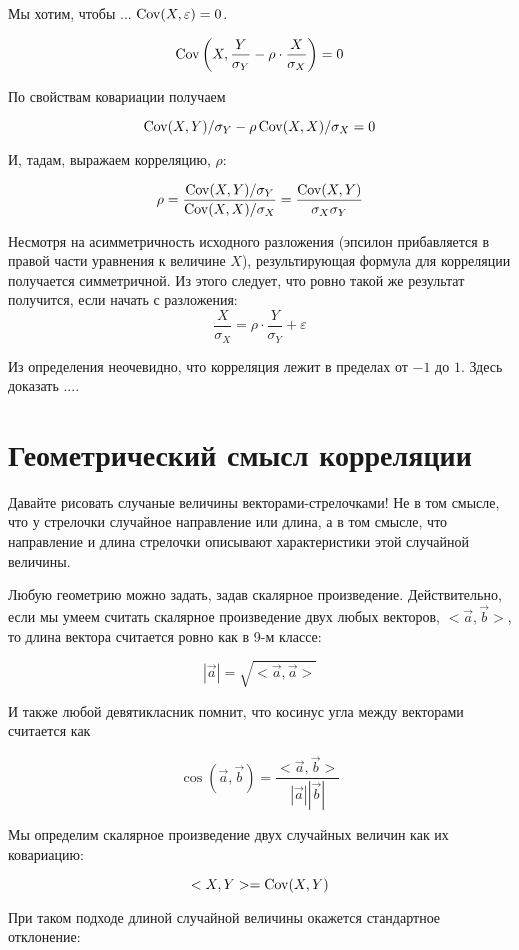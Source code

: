 \documentclass[10pt]{article}
\begin{document}
%

Мы хотим, чтобы ... $\operatorname{Cov}(X,\varepsilon)=0$. 


\[
\operatorname{Cov}\left(X, \frac{Y}{\sigma_Y} - \rho \cdot \frac{X}{\sigma_X} \right) = 0
\]

По свойствам ковариации получаем

\[
\operatorname{Cov}(X,Y)/\sigma_Y- \rho \operatorname{Cov}(X,X)/\sigma_X=0
\]

И, тадам, выражаем корреляцию, $\rho$:

\[
\rho = \frac{\operatorname{Cov}(X,Y)/\sigma_Y}{\operatorname{Cov}(X,X)/\sigma_X} = \frac{\operatorname{Cov}(X,Y)}{\sigma_X \sigma_Y}
\]

Несмотря на асимметричность исходного разложения (эпсилон прибавляется в правой части уравнения к величине $X$), результирующая формула для корреляции получается симметричной. Из этого следует, что ровно такой же результат получится, если начать с разложения:
\[
\frac{X}{\sigma_X}=\rho \cdot \frac{Y}{\sigma_Y} + \varepsilon
\]

Из определения неочевидно, что корреляция лежит в пределах от $-1$ до $1$. Здесь доказать ....



\section{Геометрический смысл корреляции}

Давайте рисовать случаные величины векторами-стрелочками! Не в том смысле, что у стрелочки случайное направление или длина, а в том смысле, что направление и длина стрелочки описывают характеристики этой случайной величины. 

Любую геометрию можно задать, задав скалярное произведение. Действительно, если мы умеем считать скалярное произведение двух любых векторов, $<\vec{a},\vec{b}>$, то длина вектора считается ровно как в 9-м классе:

\[
|\vec{a}|=\sqrt{<\vec{a},\vec{a}>}
\]

И также любой девятикласник помнит, что косинус угла между векторами считается как

\[
\cos(\vec{a},\vec{b})=\frac{<\vec{a},\vec{b}>}{|\vec{a}||\vec{b}|}
\]

Мы определим скалярное произведение двух случайных величин как их ковариацию:

\[
<X,Y>=\operatorname{Cov}(X,Y)
\]

При таком подходе длиной случайной величины окажется стандартное отклонение:
\end{document}
